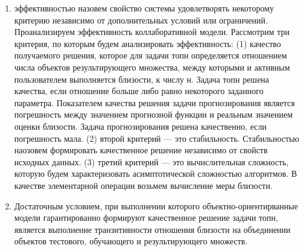\documentclass[a4paper,11pt]{proc}
\begin{document}
{\begin{enumerate}
		Правило вывода субъектно-ориентированной модели основано на
		эвристическом утверждении, которое гласит, что если между
		пользователи в прошлом были схожи по предпочтениям, то они будут
		сходи по предпочтениям и в будущем.
		Во введенной терминологии неформальное понятие
		схож заменим на отношение близости пользователей, факт выполнения
		которого устанавливается на основании значений
		функций, именуемых мерой близости. Стандартной мерой близости таких
		моделей --- коэффициент корреляции.
		Правило вывода субъектно-ориентированной модели говорит о том,
		что значение оценки близости активного пользователя можно функционально
		выразить через значения оценки близости пользователей, между которыми
		и активным выполняется отношение близости. Стандартный алгоритм решения
		задачи прогнозирования в субъектно-ориентированной модели заключается
		в двух итерациях, на первой строится
		так называемый кластер соседей, центром которого
		является активный пользователь, а элементами --- пользователи, между
		которыми и активным выполняется отношение близости. На второй итерации
		по оценкам близости элементов кластера вычисляется значение прогнозной
		функции. Для субъектно-ориентированных моделей характеристиками пользователей
		являются объекты, а значением веса --- значение близости.


	\item эффективностью назовем свойство системы удовлетворять некоторому
		критерию независимо от дополнительных условий или ограничений.
		Проанализируем эффективность коллаборативной модели.
		Рассмотрим три критерия, по которым будем анализировать эффективность:
		(1) качество получаемого решения, которое для задачи топн определяется
		отношением числа объектов результирующего множества, между
		которыми и активным пользователем выполняется близости, к числу н.
		Задача топн решена качества, если отношение больше либо равно
		некоторого заданного параметра.
		Показателем качества решения задачи прогнозирования является
		погрешность между значением прогнозной функции и реальным значением
		оценки близости. Задача прогнозирования решена качественно, если
		погрешность мала.
		(2) второй критерий --- это стабильность. Стабильностью наозовем
		формировать качественное решение независимо от свойств исходных данных.
		(3) третий критерий --- это вычислительная сложность, которую будем
		характеризовать асимптотической сложностью алгоритмов. В качестве
		элементарной операции возьмем вычисление меры близости.

	\item
		Достаточным условием, при выполнении которого
		объектно-ориентирванные модели гарантированно формируют
		качественное решение задачи топн, является выполнение транзитивности
		отношения близости на объединении объектов
		тестового, обучающего и результирующего множеств.


\end{enumerate}}
\end{document}
